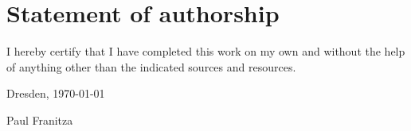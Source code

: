 
\section*{\vfill{} \thispagestyle{empty}
Statement of authorship}

I hereby certify that I have completed this work on my own and without the
help of anything other than the indicated sources and resources.
\bigskip{}

\noindent Dresden, \today %
\vspace{2.5cm}

\noindent Paul Franitza \cleardoublepage{}
